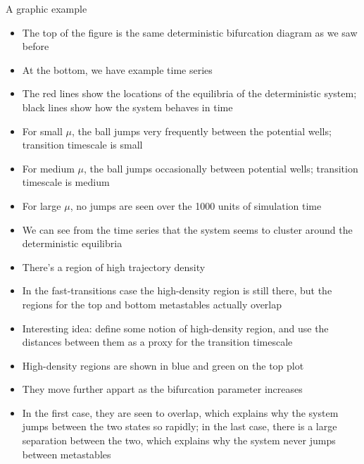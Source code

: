 \documentclass[presentation]{beamer}
\begin{document}
\begin{frame}[label={sec:org8ae4a6b},plain]{A graphic example}
\begin{itemize}
\item The top of the figure is the same deterministic bifurcation diagram as we saw before
\item At the bottom, we have example time series
\item The red lines show the locations of the equilibria of the deterministic system; black lines show how the system behaves in time
\item For small \(\mu\), the ball jumps very frequently between the potential wells; transition timescale is small
\item For medium \(\mu\), the ball jumps occasionally between potential wells; transition timescale is medium
\item For large \(\mu\), no jumps are seen over the 1000 units of simulation time
\item We can see from the time series that the system seems to cluster around the deterministic equilibria
\item There's a region of high trajectory density
\item In the fast-transitions case the high-density region is still there, but the regions for the top and bottom metastables actually overlap
\item Interesting idea: define some notion of high-density region, and use the distances between them as a proxy for the transition timescale
\item High-density regions are shown in blue and green on the top plot
\item They move further appart as the bifurcation parameter increases
\item In the first case, they are seen to overlap, which explains why the system jumps between the two states so rapidly; in the last case, there is a large separation between the two, which explains why the system never jumps between metastables
\end{itemize}
\end{frame}
\end{document}
